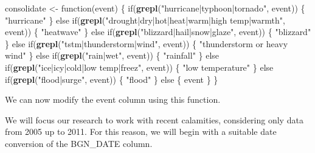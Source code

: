 \documentclass[]{article}
\newenvironment{Shaded}{\begin{snugshade}}{\end{snugshade}}
\newcommand{\KeywordTok}[1]{\textcolor[rgb]{0.13,0.29,0.53}{\textbf{{#1}}}}
\newcommand{\DataTypeTok}[1]{\textcolor[rgb]{0.13,0.29,0.53}{{#1}}}
\newcommand{\StringTok}[1]{\textcolor[rgb]{0.31,0.60,0.02}{{#1}}}
\newcommand{\NormalTok}[1]{{#1}}
\begin{document}
\begin{Shaded}
\begin{Highlighting}[]
\NormalTok{consolidate <-}\StringTok{ }\NormalTok{function(event)}
\NormalTok{\{}
  \NormalTok{if(}\KeywordTok{grepl}\NormalTok{(}\StringTok{"hurricane|typhoon|tornado"}\NormalTok{, event))}
    \NormalTok{\{ }\StringTok{"hurricane"} \NormalTok{\}}
  \NormalTok{else if(}\KeywordTok{grepl}\NormalTok{(}\StringTok{"drought|dry|hot|heat|warm|high temp|warmth"}\NormalTok{, event))}
    \NormalTok{\{ }\StringTok{"heatwave"} \NormalTok{\}}
  \NormalTok{else if(}\KeywordTok{grepl}\NormalTok{(}\StringTok{"blizzard|hail|snow|glaze"}\NormalTok{, event))}
    \NormalTok{\{ }\StringTok{"blizzard"} \NormalTok{\}}
  \NormalTok{else if(}\KeywordTok{grepl}\NormalTok{(}\StringTok{"tstm|thunderstorm|wind"}\NormalTok{, event))}
    \NormalTok{\{ }\StringTok{"thunderstorm or heavy wind"} \NormalTok{\}}
  \NormalTok{else if(}\KeywordTok{grepl}\NormalTok{(}\StringTok{"rain|wet"}\NormalTok{, event))}
    \NormalTok{\{ }\StringTok{"rainfall"} \NormalTok{\}}
  \NormalTok{else if(}\KeywordTok{grepl}\NormalTok{(}\StringTok{"ice|icy|cold|low temp|freez"}\NormalTok{, event))}
  \NormalTok{\{ }\StringTok{"low temperature"} \NormalTok{\}}
  \NormalTok{else if(}\KeywordTok{grepl}\NormalTok{(}\StringTok{"flood|surge"}\NormalTok{, event))}
    \NormalTok{\{ }\StringTok{"flood"} \NormalTok{\}}
  \NormalTok{else \{ event \}}
\NormalTok{\}}
\end{Highlighting}
\end{Shaded}

We can now modify the event column using this function.

\begin{Shaded}
\end{Shaded}

We will focus our research to work with recent calamities, considering
only data from 2005 up to 2011. For this reason, we will begin with a
suitable date conversion of the BGN\_DATE column.

\begin{Shaded}
\end{Shaded}
\end{document}
